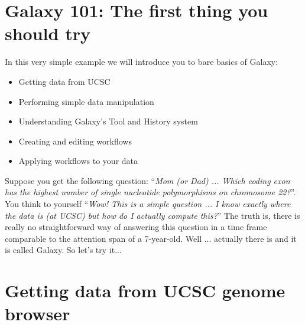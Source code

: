 \documentclass[11pt,a4paper]{article}
\begin{document}
\section*{Galaxy 101: The first thing you should try}
In this very simple example we will introduce you to bare basics of Galaxy:
\begin{itemize}
	\item Getting data from UCSC
	\item Performing simple data manipulation
	\item Understanding Galaxy's Tool and History system
	\item Creating and editing workflows
	\item Applying workflows to your data
\end{itemize}
Suppose you get the following question: ``\textit{Mom (or Dad) ... Which coding exon has the highest number of single nucleotide polymorphisms on chromosome 22?}''. You think to yourself ``\textit{Wow! This is a simple question ... I know exactly where the data is (at UCSC) but how do I actually compute this?}'' The truth is, there is really no
straightforward way of answering this question in a time frame comparable to the attention span of a 7-year-old. Well ... actually there is and it is called Galaxy. So let's try it...

\section{Getting data from UCSC genome browser}
\end{document}
